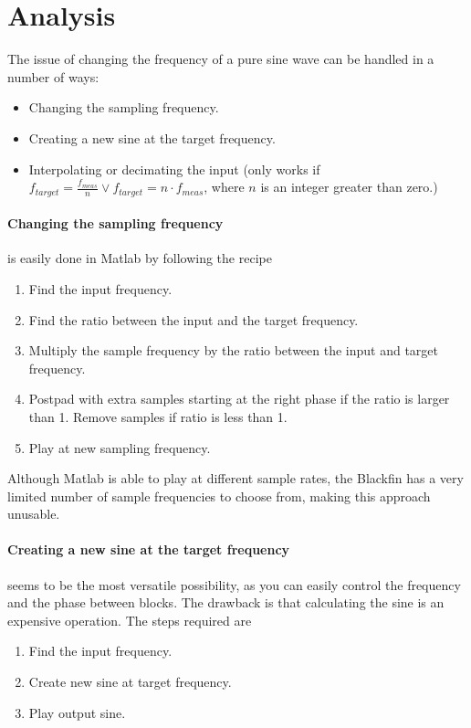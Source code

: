 
\section{Analysis}
\label{sec:simpleanal}
The issue of changing the frequency of a pure sine wave can be handled in a number of ways:
\begin{itemize}
	\item Changing the sampling frequency.
	\item Creating a new sine at the target frequency.
	\item Interpolating or decimating the input (only works if $f_{target}=\frac{f_{meas}}{n}\vee f_{target} =n\cdot f_{meas}$, where $n$ is an integer greater than zero.)
\end{itemize}

\paragraph{Changing the sampling frequency} is easily done in Matlab by following the recipe
\begin{enumerate}
	\item Find the input frequency.
	\item Find the ratio between the input and the target frequency.
	\item Multiply the sample frequency by the ratio between the input and target frequency.
	\item Postpad with extra samples starting at the right phase if the ratio is larger than 1. Remove samples if ratio is less than 1.
	\item Play at new sampling frequency.
\end{enumerate}
Although Matlab is able to play at different sample rates, the Blackfin has a very limited number of sample frequencies to choose from, making this approach unusable.

\paragraph{Creating a new sine at the target frequency} seems to be the most versatile possibility, as you can easily control the frequency and the phase between blocks. The drawback is that calculating the sine is an expensive operation. The steps required are
\begin{enumerate}
	\item Find the input frequency.
	\item Create new sine at target frequency.
	\item Play output sine.
\end{enumerate}

